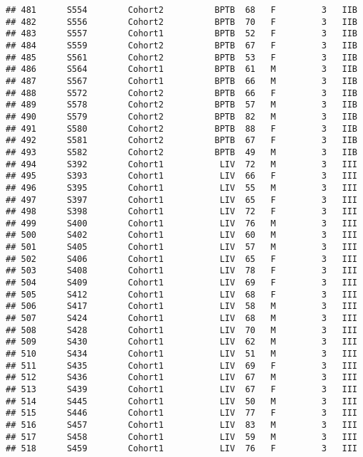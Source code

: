 \documentclass[
]{article}
\begin{document}
\begin{verbatim}
## 481      S554        Cohort2          BPTB  68   F         3   IIB
## 482      S556        Cohort2          BPTB  70   F         3   IIB
## 483      S557        Cohort1          BPTB  52   F         3   IIB
## 484      S559        Cohort2          BPTB  67   F         3   IIB
## 485      S561        Cohort2          BPTB  53   F         3   IIB
## 486      S564        Cohort1          BPTB  61   M         3   IIB
## 487      S567        Cohort1          BPTB  66   M         3   IIB
## 488      S572        Cohort2          BPTB  66   F         3   IIB
## 489      S578        Cohort2          BPTB  57   M         3   IIB
## 490      S579        Cohort2          BPTB  82   M         3   IIB
## 491      S580        Cohort2          BPTB  88   F         3   IIB
## 492      S581        Cohort2          BPTB  67   F         3   IIB
## 493      S582        Cohort2          BPTB  49   M         3   IIB
## 494      S392        Cohort1           LIV  72   M         3   III
## 495      S393        Cohort1           LIV  66   F         3   III
## 496      S395        Cohort1           LIV  55   M         3   III
## 497      S397        Cohort1           LIV  65   F         3   III
## 498      S398        Cohort1           LIV  72   F         3   III
## 499      S400        Cohort1           LIV  76   M         3   III
## 500      S402        Cohort1           LIV  60   M         3   III
## 501      S405        Cohort1           LIV  57   M         3   III
## 502      S406        Cohort1           LIV  65   F         3   III
## 503      S408        Cohort1           LIV  78   F         3   III
## 504      S409        Cohort1           LIV  69   F         3   III
## 505      S412        Cohort1           LIV  68   F         3   III
## 506      S417        Cohort1           LIV  58   M         3   III
## 507      S424        Cohort1           LIV  68   M         3   III
## 508      S428        Cohort1           LIV  70   M         3   III
## 509      S430        Cohort1           LIV  62   M         3   III
## 510      S434        Cohort1           LIV  51   M         3   III
## 511      S435        Cohort1           LIV  69   F         3   III
## 512      S436        Cohort1           LIV  67   M         3   III
## 513      S439        Cohort1           LIV  67   F         3   III
## 514      S445        Cohort1           LIV  50   M         3   III
## 515      S446        Cohort1           LIV  77   F         3   III
## 516      S457        Cohort1           LIV  83   M         3   III
## 517      S458        Cohort1           LIV  59   M         3   III
## 518      S459        Cohort1           LIV  76   F         3   III

\end{verbatim}
\end{document}
